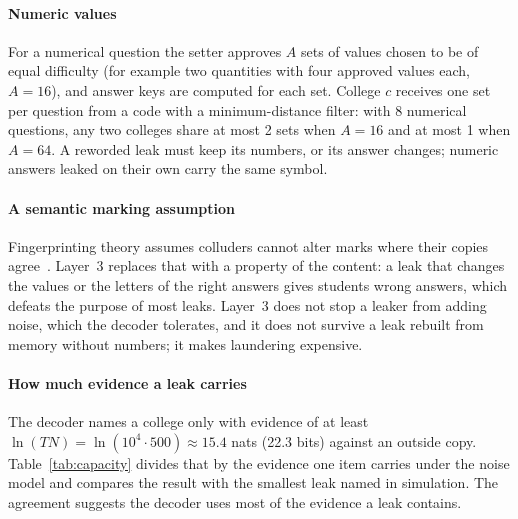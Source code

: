 \documentclass[10pt,a4paper]{article}
\theoremstyle{remark}
\begin{document}
\paragraph{Numeric values} For a numerical question the setter approves $A$ sets of values chosen to be of equal difficulty (for example two quantities with four approved values each, $A=16$), and answer keys are computed for each set. College $c$ receives one set per question from a code with a minimum-distance filter: with 8 numerical questions, any two colleges share at most 2 sets when $A=16$ and at most 1 when $A=64$. A reworded leak must keep its numbers, or its answer changes; numeric answers leaked on their own carry the same symbol.

\paragraph{A semantic marking assumption} Fingerprinting theory assumes colluders cannot alter marks where their copies agree~\citep{boneh1998}. Layer~3 replaces that with a property of the content: a leak that changes the values or the letters of the right answers gives students wrong answers, which defeats the purpose of most leaks. Layer~3 does not stop a leaker from adding noise, which the decoder tolerates, and it does not survive a leak rebuilt from memory without numbers; it makes laundering expensive.

\paragraph{How much evidence a leak carries} The decoder names a college only with evidence of at least $\ln(TN)=\ln(10^4\cdot 500)\approx 15.4$ nats (22.3 bits) against an outside copy. Table~\ref{tab:capacity} divides that by the evidence one item carries under the noise model and compares the result with the smallest leak named in simulation. The agreement suggests the decoder uses most of the evidence a leak contains.
\end{document}
